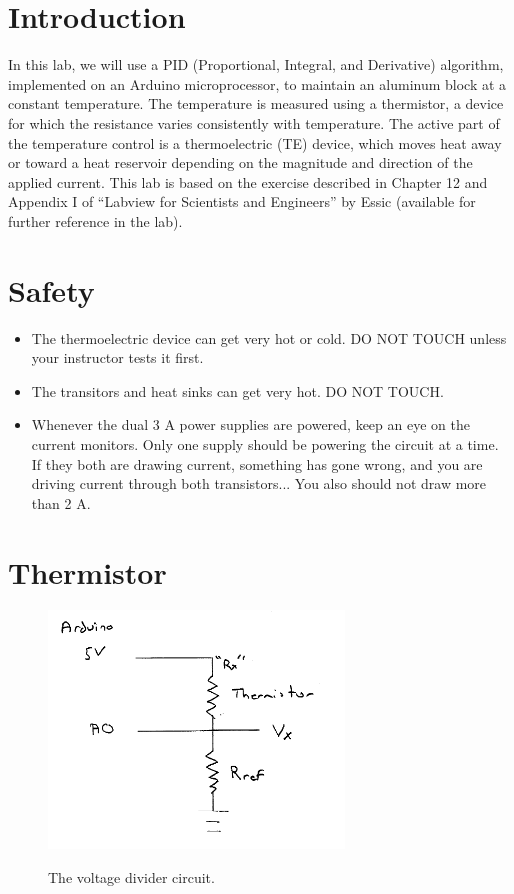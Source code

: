 \documentclass[12pt]{article}
\begin{document}
\section{Introduction}

In this lab, we will use a PID (Proportional, Integral, and Derivative)
algorithm, implemented on an Arduino microprocessor, to maintain an aluminum
block at a constant temperature.  The temperature is measured using a
thermistor, a device for which the resistance varies consistently with
temperature.  The active part of the temperature control is a thermoelectric
(TE) device, which moves heat away or toward a heat reservoir depending on the
magnitude and direction of the applied current.  This lab is based on the
exercise described in Chapter 12 and Appendix I of ``Labview for Scientists and
Engineers'' by Essic (available for further reference in the lab).

\section{Safety}

\begin{itemize}
\item The thermoelectric device can get very hot or cold.  DO NOT TOUCH unless your instructor tests it first.

\item The transitors and heat sinks can get very hot.  DO NOT TOUCH.

\item Whenever the dual 3 A power supplies are powered, keep an eye on the
  current monitors.  Only one supply should be powering the circuit at a time.
  If they both are drawing current, something has gone wrong, and you are
  driving current through both transistors...  You also should not draw more
  than 2 A.
\end{itemize}

\section{Thermistor}

\begin{figure}[ht]
\begin{center}
{\includegraphics[width=0.70\textwidth]{figs/divider.png}}
\end{center}
\caption{\label{fig:divider} The voltage divider circuit.}
\end{figure}
\end{document}
